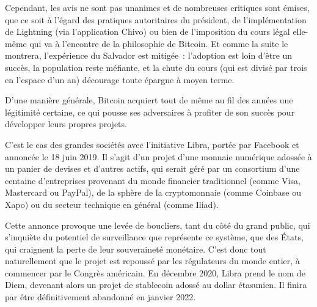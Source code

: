 Cependant, les avis ne sont pas unanimes et de nombreuses critiques sont émises, que ce soit à l'égard des pratiques autoritaires du président, de l'implémentation de Lightning (via l'application Chivo) ou bien de l'imposition du cours légal elle-même qui va à l'encontre de la philosophie de Bitcoin. Et comme la suite le montrera, l'expérience du Salvador est mitigée~: l'adoption est loin d'être un succès, la population reste méfiante, et la chute du cours (qui est divisé par trois en l'espace d'un an) décourage toute épargne à moyen terme.

D'une manière générale, Bitcoin acquiert tout de même au fil des années une légitimité certaine, ce qui pousse ses adversaires à profiter de son succès pour développer leurs propres projets.

C'est le cas des grandes sociétés avec l'initiative Libra, portée par Facebook et annoncée le 18 juin 2019. Il s'agit d'un projet d'une monnaie numérique adossée à un panier de devises et d'autres actifs, qui serait géré par un consortium d'une centaine d'entreprises provenant du monde financier traditionnel (comme Visa, Mastercard ou PayPal), de la sphère de la cryptomonnaie (comme Coinbase ou Xapo) ou du secteur technique en général (comme Iliad). %

Cette annonce provoque une levée de boucliers, tant du côté du grand public, qui s'inquiète du potentiel de surveillance que représente ce système, que des États, qui craignent la perte de leur souveraineté monétaire. C'est donc tout naturellement que le projet est repoussé par les régulateurs du monde entier, à commencer par le Congrès américain. En décembre 2020, Libra prend le nom de Diem, devenant alors un projet de stablecoin adossé au dollar étasunien. Il finira par être définitivement abandonné en janvier 2022.

